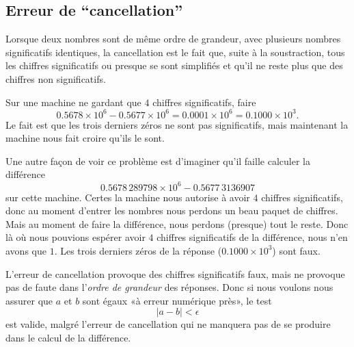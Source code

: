 \subsection{Erreur de ``cancellation''}

Lorsque deux nombres sont de même ordre de grandeur, avec plusieurs nombres significatifs identiques, la cancellation est le fait que, suite à la soustraction, tous les chiffres significatifs ou presque se sont simplifiés et qu'il ne reste plus que des chiffres non significatifs.

\begin{example}
	Sur une machine ne gardant que \( 4\) chiffres significatifs, faire
	\begin{equation}
		0.5678\times 10^6-0.5677\times 10^6 = 0.0001\times 10^6=0.1000\times 10^3.
	\end{equation}
	Le fait est que les trois derniers zéros ne sont pas significatifs, mais maintenant la machine nous fait croire qu'ils le sont.

	Une autre façon de voir ce problème est d'imaginer qu'il faille calculer la différence
	\begin{equation}
		0.5678\,289798\times 10^6 - 0.5677\,3136907
	\end{equation}
	sur cette machine. Certes la machine nous autorise à avoir \( 4\) chiffres significatifs, donc au moment d'entrer les nombres nous perdons un beau paquet de chiffres. Mais au moment de faire la différence, nous perdons (presque) tout le reste. Donc là où nous pouvions espérer avoir \( 4\) chiffres significatifs de la différence, nous n'en avons que \( 1\). Les trois derniers zéros de la réponse (\( 0.1000\times 10^3\)) sont faux.
\end{example}

\begin{remark}  \label{REMooRQIJooNLdAZE}
	L'erreur de cancellation provoque des chiffres significatifs faux, mais ne provoque pas de faute dans l'\emph{ordre de grandeur} des réponses. Donc si nous voulons nous assurer que \( a\) et \( b\) sont égaux «à erreur numérique près», le test
	\begin{equation}
		| a-b |<\epsilon
	\end{equation}
	est valide, malgré l'erreur de cancellation qui ne manquera pas de se produire dans le calcul de la différence.
\end{remark}

